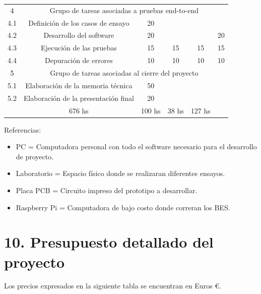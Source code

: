 \documentclass[11pt]{charter}
\begin{document}
\begin{table}[H]
{\begin{tabular}{|c|c|c|c|c|c|}
			
			\rowcolor[HTML]{B8BAB5} 
			\textcolor{black}{4} & \multicolumn{5}{|c|}{Grupo de tareas asociadas a pruebas end-to-end} \\ \cline{1-6}		   
			4.1  & Definición de los casos de ensayo & 20 &  &  &  \\ \hline   
			4.2  & Desarrollo del software & 20 &  &  & 20 \\ \hline
			4.3  & Ejecución de las pruebas & 15 & 15 & 15 & 15 \\ \hline   
			4.4  & Depuración de errores & 10 & 10 & 10 & 10 \\ \hline
			
			
			\rowcolor[HTML]{ADF3FF} 
			\textcolor{black}{5} & \multicolumn{5}{|c|}{Grupo de tareas asociadas al cierre del proyecto} \\ \cline{1-6}		   
			5.1  & Elaboración de la memoria técnica & 50 &  &  &  \\ \hline   
			5.2  & Elaboración de la presentación final & 20 &  &  &  \\ \hline
	
	
			\rowcolor[HTML]{C0C0C0} 
			\multicolumn{2}{|c|}{\cellcolor[HTML]{C0C0C0} Totales} &676 hs & 100 hs &38  hs &  127 hs \\ \hline
		\end{tabular}%
	}
\end{table}

{\footnotesize
	Referencias:
	\begin{itemize}
		\item PC = Computadora personal con todo el software necesario para el desarrollo de proyecto.
		\item Laboratorio = Espacio físico donde se realizaran diferentes ensayos.
		\item Placa PCB = Circuito impreso del prototipo a desarrollar.
		\item Raspberry Pi = Computadora de bajo costo donde correran los BES.
	\end{itemize}
} %

\section{10. Presupuesto detallado del proyecto}
\label{sec:presupuesto}
Los precios expresados en la siguiente tabla se encuentran en Euros \euro{}.\\
\end{document}
